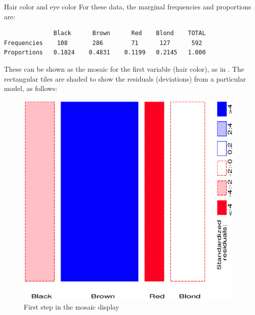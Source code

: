 \begin{Example}[haireye2a]{Hair color and eye color}
For these data, the marginal frequencies and proportions are:

\begin{minipage}{\linewidth} 
\begin{verbatim} 
              Black      Brown      Red    Blond    TOTAL
Frequencies    108       286        71      127      592
Proportions   0.1824    0.4831    0.1199   0.2145   1.000
\end{verbatim}
\end{minipage}


These can be shown as the mosaic for the first variable (hair color),
as in .
The rectangular tiles are shaded to show the residuals (deviations)
from a particular model, as follows:
\begin{figure}[htb]
  \centering
  \includegraphics[scale=.6]{ch4/fig/mosaic32}
  \caption{First step in the mosaic display}%
  \label{fig:mosaic32}
\end{figure}


\end{Example}
